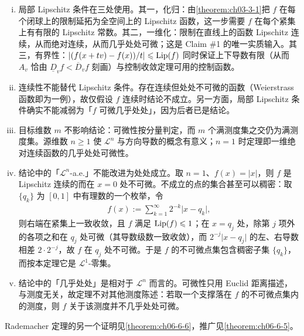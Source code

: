 \documentclass[../../main.tex]{subfiles}%
\begin{document}
\begin{remark}\label{remark:ch03-thm-3-2-条件}
\begin{enumerate}[(i)]
\item 局部 Lipschitz 条件在三处使用。其一，化归：由\cref{theorem:ch03-3-1}把 $f$ 在每个闭球上的限制延拓为全空间上的 Lipschitz 函数，这一步需要 $f$ 在每个紧集上有有限的 Lipschitz 常数。其二，一维化：限制在直线上的函数 Lipschitz 连续，从而绝对连续，从而几乎处处可微；这是 Claim \#1 的唯一实质输入。其三，有界性：$\lvert(f(x+tv)-f(x))/t\rvert\leqslant\operatorname{Lip}(f)$ 同时保证上下导数有限（从而 $A_v$ 恰由 $\underline{D}_vf<\overline{D}_vf$ 刻画）与控制收敛定理可用的控制函数。%
\item 连续性不能替代 Lipschitz 条件。存在连续但处处不可微的函数（Weierstrass 函数即为一例），故仅假设 $f$ 连续时结论不成立。另一方面，局部 Lipschitz 条件确实不能减弱为「$f$ 可微几乎处处」，因为后者已是结论。
\item 目标维数 $m$ 不影响结论：可微性按分量判定，而 $m$ 个满测度集之交仍为满测度集。源维数 $n\geqslant1$ 使 $\mathcal{L}^n$ 与方向导数的概念有意义；$n=1$ 时定理即一维绝对连续函数的几乎处处可微性。
\item 结论中的「$\mathcal{L}^n$-a.e.」不能改进为处处成立。取 $n=1$、$f(x)=\lvert x\rvert$，则 $f$ 是 Lipschitz 连续的而在 $x=0$ 处不可微。不成立的点的集合甚至可以稠密：取 $\{q_k\}$ 为 $[0,1]$ 中有理数的一个枚举，令
\begin{align*}
f(x):=\sum_{k=1}^{\infty}2^{-k}\lvert x-q_k\rvert ,
\end{align*}
则右端在紧集上一致收敛，且 $f$ 满足 $\operatorname{Lip}(f)\leqslant1$；在 $x=q_j$ 处，除第 $j$ 项外的各项之和在 $q_j$ 处可微（其导数级数一致收敛），而 $2^{-j}\lvert x-q_j\rvert$ 的左、右导数相差 $2\cdot2^{-j}$，故 $f$ 在 $q_j$ 处不可微。于是 $f$ 的不可微点集包含稠密子集 $\{q_k\}$，而按本定理它是 $\mathcal{L}^1$-零集。
\item 结论中的「几乎处处」是相对于 $\mathcal{L}^n$ 而言的。可微性只用 Euclid 距离描述，与测度无关，故定理不对其他测度陈述：若取一个支撑落在 $f$ 的不可微点集内的测度，则 $f$ 关于该测度并不几乎处处可微。
\end{enumerate}
\end{remark}

\begin{remark}\label{remark:ch03-thm-3-2-另证}
Rademacher 定理的另一个证明见\cref{theorem:ch06-6-6}，推广见\cref{theorem:ch06-6-5}。%
\end{remark}
\end{document}
